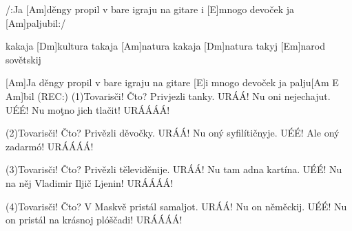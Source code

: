 
/:Ja [Am]děngy propil v bare
igraju na gitare
i [E]mnogo devoček ja [Am]paljubil:/

kakaja [Dm]kultura takaja [Am]natura 
kakaja [Dm]natura takyj [Em]narod sovětskij

[Am]Ja děngy propil v bare
igraju na gitare 
[E]i mnogo devoček ja palju[Am E Am]bil
(REC:)
(1)Tovarisči!                         Čto?
Privjezli tanky.                   URÁÁ!
Nu oni nejechajut.                 UÉÉ!
Nu moţno jich tlačit!              URÁÁÁÁ!

(2)Tovarisči!                         Čto?
Privězli děvočky.                  URÁÁ! 
Nu oný syfilítičnyje.              UÉÉ! 
Ale oný zadarmó!                   URÁÁÁÁ!

(3)Tovarisči!                         Čto?
Privězli těleviděnije.             URÁÁ!
Nu tam adna kartína.               UÉÉ!
Nu na něj Vladimir Iljič Ljenin!   URÁÁÁÁ!

(4)Tovarisči!                         Čto?
V Maskvě pristál samaljot.         URÁÁ!
Nu on něměckij.                    UÉÉ!
Nu on pristál na krásnoj plóščadi! URÁÁÁÁ!